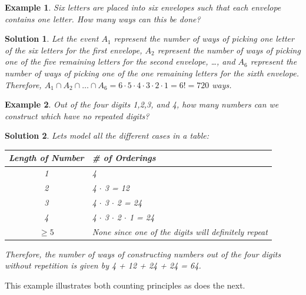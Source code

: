 \documentclass[12pt, letterpaper, onecolumn, conference, final]{IEEEtran}
\theoremstyle{definition}
\theoremstyle{plain}
\newtheorem{example}{Example}[section]
\newtheorem{solution}{Solution}[section]
\begin{document}
\begin{example}
Six letters are placed into six envelopes such that each envelope contains one letter. How many ways can this be done?
\end{example}
\begin{solution}
Let the event $A_1$ represent the number of ways of picking one letter of the six letters for the first envelope, $A_2$ represent the number of ways of picking one of the five remaining letters for the second envelope, \dots, and $A_6$ represent the number of ways of picking one of the one remaining letters for the sixth envelope. Therefore, $A_1 \cap A_2 \cap \dots \cap A_{6} = 6 \cdot 5 \cdot 4 \cdot 3 \cdot 2 \cdot 1 = 6! = 720$ ways.
\end{solution}

\begin{example}
Out of the four digits 1,2,3, and 4, how many numbers can we construct which have no repeated digits?
\end{example}

\newpage
\begin{solution}
Lets model all the different cases in a table:
\begin{center}
\begin{tabular}{| c | l |}
\hline
Length of Number & \# of Orderings \\ \hline
1 & 4 \\ \hline
2 & 4 $\cdot$ 3 = 12 \\ \hline
3 & 4 $\cdot$ 3 $\cdot$ 2 = 24 \\ \hline
4 & 4 $\cdot$ 3 $\cdot$ 2 $\cdot$ 1 = 24 \\ \hline
$\geq 5$ & None since one of the digits will definitely repeat \\ \hline
\end{tabular}
\end{center}
Therefore, the number of ways of constructing numbers out of the four digits without repetition is given by 4 + 12 + 24 + 24 = 64.
\end{solution}

\noindent
This example illustrates both counting principles as does the next.
\end{document}
